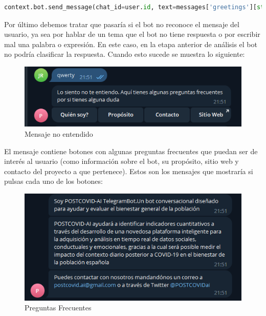 \begin{lstlisting}[language=Python]
context.bot.send_message(chat_id=user.id, text=messages['greetings'][str(random_var)])
\end{lstlisting}

Por último debemos tratar que pasaría si el bot no reconoce el mensaje del usuario, ya sea por hablar de un tema que el bot no tiene respuesta o por escribir mal una palabra o expresión. En este caso, en la etapa anterior de análisis el bot no podría clasificar la respuesta. Cuando esto sucede se muestra lo siguiente:\vspace{1cm}

\begin{figure}[!ht]
    \centering
    \includegraphics[width=1\textwidth]{imagenes/no_respuesta.png}
    \caption{ Mensaje no entendido }
    \label{fig:enter-label}
\end{figure}\vspace{0.3cm}

El mensaje contiene botones con algunas preguntas frecuentes que puedan ser de interés al usuario (como información sobre el bot, su propósito, sitio web y contacto del proyecto a que pertenece). Estos son los mensajes que mostraría si pulsas cada uno de los botones:\vspace{0.3cm}

\begin{figure}[!ht]
    \centering
    \includegraphics[width=1\textwidth]{imagenes/preguntas_frecuentes.png}
    \caption{ Preguntas Frecuentes }
    \label{fig:enter-label}
\end{figure}\vspace{0.3cm}

